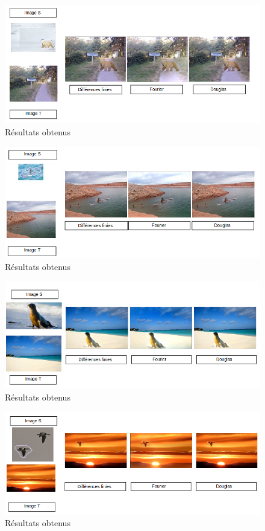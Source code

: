 \begin{figure}[!h]
\centering
\includegraphics[scale=0.5]{Images/Resultats/4.png}
\caption{Résultats obtenus}
\end{figure}
\begin{figure}[!h]
\centering
\includegraphics[scale=0.5]{Images/Resultats/5.png}
\caption{Résultats obtenus}
\end{figure}
\begin{figure}[!h]
\centering
\includegraphics[scale=0.5]{Images/Resultats/6.png}
\caption{Résultats obtenus}
\end{figure}
\begin{figure}[!h]
\centering
\includegraphics[scale=0.5]{Images/Resultats/7.png}
\caption{Résultats obtenus}
\end{figure}

